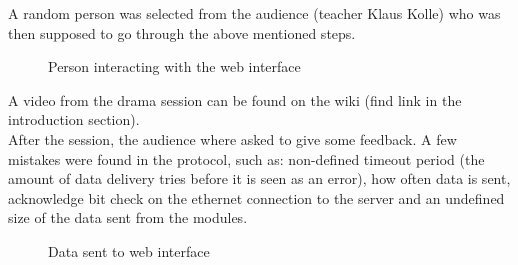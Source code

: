 A random person was selected from the audience (teacher Klaus Kolle) who was then supposed to go through the above mentioned steps. 

\begin{figure}[H]
  \centering
  \hspace{0.2cm}                
  \caption{Person interacting with the web interface}
  \label{fig:drama_web}
\end{figure}

A video from the drama session can be found on the wiki (find link in the introduction section).
\\[0.2cm]
After the session, the audience where asked to give some feedback. A few mistakes were found in the protocol, such as: non-defined timeout period (the amount of data delivery tries before it is seen as an error), how often data is sent, acknowledge bit check on the ethernet connection to the server and an undefined size of the data sent from the modules. 

\begin{figure}[H]
  \centering
  \hspace{0.2cm}                
  \caption{Data sent to web interface}
  \label{fig:drama_data_to_web}
\end{figure}

